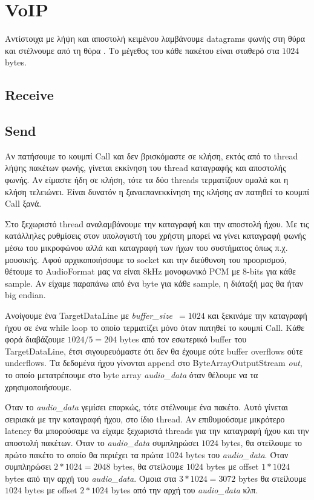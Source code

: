 \documentclass{article}
\begin{document}
\section{VoIP}
Αντίστοιχα με λήψη και αποστολή κειμένου λαμβάνουμε datagrams φωνής στη θύρα \voicedestport{} και 
στέλνουμε από τη θύρα \voicesrcport. Το μέγεθος του κάθε πακέτου είναι σταθερό στα $1024$ bytes.
\subsection{Receive}
\subsection{Send}
Aν πατήσουμε το κουμπί Call και δεν βρισκόμαστε σε κλήση, 
εκτός από το thread λήψης πακέτων φωνής, γίνεται εκκίνηση του thread καταγραφής και αποστολής φωνής.
Αν είμαστε ήδη σε κλήση, τότε τα δύο threads τερματίζουν ομαλά και η κλήση τελειώνει. Είναι δυνατόν
η ξαναεπανεκκίνηση της κλήσης αν πατηθεί το κουμπί Call ξανά.

Στο ξεχωριστό thread αναλαμβάνουμε την καταγραφή και την αποστολή ήχου. Με τις κατάλληλες ρυθμίσεις
στον υπολογιστή του χρήστη μπορεί να γίνει καταγραφή φωνής μέσω του μικροφώνου αλλά και καταγραφή των
ήχων του συστήματος όπως π.χ. μουσικής. Αφού αρχικοποιήσουμε το socket και την διεύθυνση του προορισμού,
θέτουμε το AudioFormat μας να είναι 8kHz μονοφωνικό PCM με 8-bits για κάθε sample. Αν είχαμε παραπάνω από 
ένα byte για κάθε sample, η διάταξή μας θα ήταν big endian. 

Ανοίγουμε ένα TargetDataLine με \mbox{\textit{buffer\_size} $= 1024$} και ξεκινάμε την καταγραφή ήχου
σε ένα while loop το οποίο τερματίζει μόνο όταν πατηθεί το κουμπί Call.
Κάθε φορά διαβάζουμε $1024/5 = 204$ bytes από τον εσωτερικό buffer του TargetDataLine, έτσι σιγουρευόμαστε
ότι δεν θα έχουμε ούτε buffer overflows ούτε underflows. Τα δεδομένα ήχου γίνονται append στο 
ByteArrayOutputStream \textit{out}, το οποίο μετατρέπουμε στο byte array \textit{audio\_data} όταν
θέλουμε να τα χρησιμοποιήσουμε.

Όταν το \textit{audio\_data} γεμίσει επαρκώς, τότε στέλνουμε ένα πακέτο. Αυτό γίνεται σειριακά με την
καταγραφή ήχου, στο ίδιο thread. Αν επιθυμούσαμε μικρότερο latency θα μπορούσαμε να είχαμε ξεχωριστά 
threads για την καταγραφή ήχου και την αποστολή πακέτων. Όταν το \textit{audio\_data}
συμπληρώσει $1024$ bytes, θα στείλουμε το πρώτο πακέτο το οποίο θα περιέχει τα πρώτα $1024$ bytes
του \textit{audio\_data}. Όταν συμπληρώσει $2*1024 = 2048$ bytes, θα στείλουμε $1024$ bytes με
offset $1*1024$ bytes από την αρχή του \textit{audio\_data}. Όμοια στα  $3*1024 = 3072$ bytes
θα στείλουμε $1024$ bytes με offset $2*1024$ bytes από την αρχή του \textit{audio\_data} κλπ.
\end{document}
